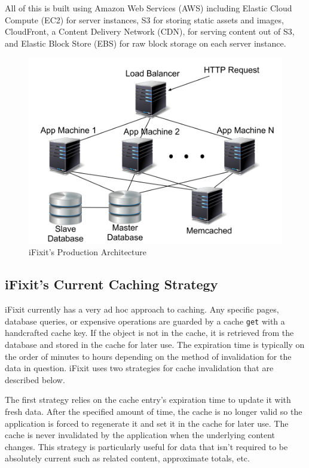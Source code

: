 \documentclass[12pt]{ucthesis}
\begin{document}
All of this is built using Amazon Web Services (AWS) including Elastic Cloud Compute (EC2) for server instances, S3 for storing static assets and images, CloudFront, a Content Delivery Network (CDN), for serving content out of S3, and Elastic Block Store (EBS) for raw block storage on each server instance.

\begin{figure}[h]
\centering
\includegraphics[width=\textwidth]{assets/iFixitArchitecture.png}
\caption{iFixit's Production Architecture}
\label{fig:iFixitArchitecture}
\end{figure}


\subsection{iFixit's Current Caching Strategy}
\textsf{iFixit} currently has a very ad hoc approach to caching.
Any specific pages, database queries, or expensive operations are guarded by a cache {\tt get} with a handcrafted cache key.
If the object is not in the cache, it is retrieved from the database and stored in the cache for later use.
The expiration time is typically on the order of minutes to hours depending on the method of invalidation for the data in question.
\textsf{iFixit} uses two strategies for cache invalidation that are described below.

The first strategy relies on the cache entry's expiration time to update it with fresh data.
After the specified amount of time, the cache is no longer valid so the application is forced to regenerate it and set it in the cache for later use.
The cache is never invalidated by the application when the underlying content changes.
This strategy is particularly useful for data that isn't required to be absolutely current such as related content, approximate totals, etc.
\end{document}
